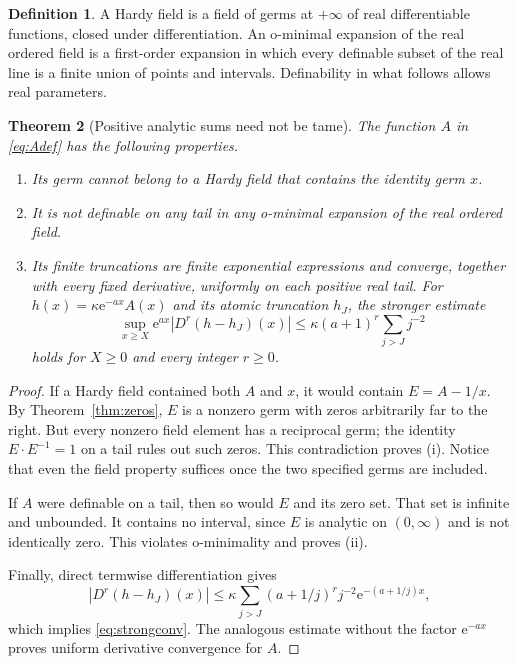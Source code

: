 \documentclass[11pt,a4paper]{article}
\newtheorem{theorem}{Theorem}[section]
\theoremstyle{definition}
\newtheorem{definition}[theorem]{Definition}
\theoremstyle{remark}
\newcommand{\e}{\mathrm e}
\numberwithin{equation}{section}
\begin{document}
\begin{definition}
A Hardy field is a field of germs at $+\infty$ of real differentiable functions, closed under differentiation. An o-minimal expansion of the real ordered field is a first-order expansion in which every definable subset of the real line is a finite union of points and intervals. Definability in what follows allows real parameters.
\end{definition}

\begin{theorem}[Positive analytic sums need not be tame]\label{thm:tameness}
The function $A$ in \eqref{eq:Adef} has the following properties.
\begin{enumerate}[label=(\roman*)]
\item Its germ cannot belong to a Hardy field that contains the identity germ $x$.
\item It is not definable on any tail in any o-minimal expansion of the real ordered field.
\item Its finite truncations are finite exponential expressions and converge, together with every fixed derivative, uniformly on each positive real tail. For $h(x)=\kappa\e^{-ax}A(x)$ and its atomic truncation $h_J$, the stronger estimate
\begin{equation}\label{eq:strongconv}
 \sup_{x\ge X}\e^{ax}|D^r(h-h_J)(x)|
 \le \kappa(a+1)^r\sum_{j>J}j^{-2}
\end{equation}
holds for $X\ge0$ and every integer $r\ge0$.
\end{enumerate}
\end{theorem}
\begin{proof}
If a Hardy field contained both $A$ and $x$, it would contain $E=A-1/x$. By Theorem~\ref{thm:zeros}, $E$ is a nonzero germ with zeros arbitrarily far to the right. But every nonzero field element has a reciprocal germ; the identity $E\cdot E^{-1}=1$ on a tail rules out such zeros. This contradiction proves (i). Notice that even the field property suffices once the two specified germs are included.

If $A$ were definable on a tail, then so would $E$ and its zero set. That set is infinite and unbounded. It contains no interval, since $E$ is analytic on $(0,\infty)$ and is not identically zero. This violates o-minimality and proves (ii).

Finally, direct termwise differentiation gives
\[
 |D^r(h-h_J)(x)|
 \le\kappa\sum_{j>J}(a+1/j)^rj^{-2}\e^{-(a+1/j)x},
\]
which implies \eqref{eq:strongconv}. The analogous estimate without the factor $\e^{-ax}$ proves uniform derivative convergence for $A$.
\end{proof}
\end{document}
